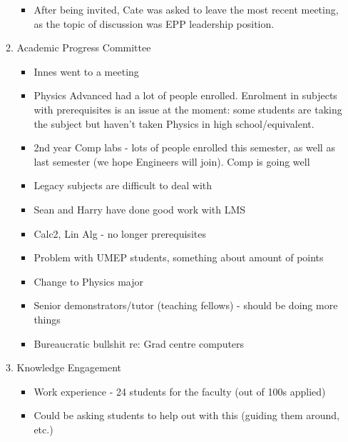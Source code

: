 \documentclass[a4paper,12pt]{article}
\begin{document}
\begin{enumerate}
\begin{enumerate}
\begin{itemize}
	\item After being invited, Cate was asked to leave the most recent meeting, as the topic of discussion was EPP leadership position.

	\end{itemize}	
	
	\item Academic Progress Committee
	\begin{itemize}
	
	\item Innes went to a meeting
	
	\item Physics Advanced had a lot of people enrolled. Enrolment in subjects with prerequisites is an issue at the moment: some students are taking the subject but haven't taken Physics in high school/equivalent.
	
	\item 2nd year Comp labs - lots of people enrolled this semester, as well as last semester (we hope Engineers will join). Comp is going well	
	
	\item Legacy subjects are difficult to deal with
	
	\item Sean and Harry have done good work with LMS
	
	\item Calc2, Lin Alg - no longer prerequisites
	
	\item Problem with UMEP students, something about amount of points
	
	\item Change to Physics major
	
	\item Senior demonstrators/tutor (teaching fellows) - should be doing more things	
	
	\item Bureaucratic bullshit re: Grad centre computers

	\end{itemize}	
	
	\item Knowledge Engagement
	\begin{itemize}

	\item Work experience - 24 students for the faculty (out of 100s applied)
	
	\item Could be asking students to help out with this (guiding them around, etc.)
	

\end{itemize}
\end{enumerate}
\end{enumerate}
\end{document}
